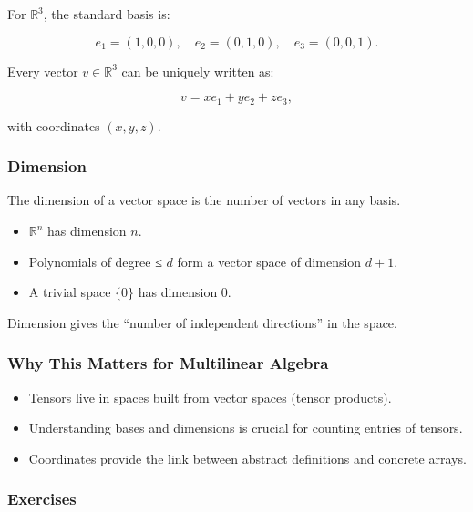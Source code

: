 \documentclass[
  letterpaper,
  DIV=11,
  numbers=noendperiod]{scrreprt}
\providecommand{\tightlist}{%
  \setlength{\itemsep}{0pt}\setlength{\parskip}{0pt}}
\begin{document}
For \(\mathbb{R}^3\), the standard basis is:

\[
e_1 = (1,0,0), \quad e_2 = (0,1,0), \quad e_3 = (0,0,1).
\]

Every vector \(v \in \mathbb{R}^3\) can be uniquely written as:

\[
v = x e_1 + y e_2 + z e_3,
\]

with coordinates \((x,y,z)\).

\subsubsection{Dimension}\label{dimension}

The dimension of a vector space is the number of vectors in any basis.

\begin{itemize}
\tightlist
\item
  \(\mathbb{R}^n\) has dimension \(n\).
\item
  Polynomials of degree ≤ \(d\) form a vector space of dimension
  \(d+1\).
\item
  A trivial space \(\{0\}\) has dimension 0.
\end{itemize}

Dimension gives the ``number of independent directions'' in the space.

\subsubsection{Why This Matters for Multilinear
Algebra}\label{why-this-matters-for-multilinear-algebra}

\begin{itemize}
\tightlist
\item
  Tensors live in spaces built from vector spaces (tensor products).
\item
  Understanding bases and dimensions is crucial for counting entries of
  tensors.
\item
  Coordinates provide the link between abstract definitions and concrete
  arrays.
\end{itemize}

\subsubsection{Exercises}\label{exercises-4}
\end{document}

